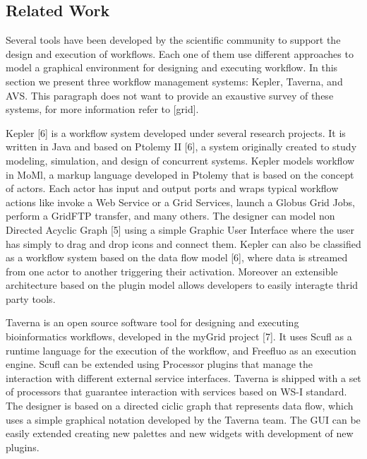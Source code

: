 \documentclass[conference]{IEEEtran}
\begin{document}
\subsection {Related Work}




Several tools have been developed by the scientific community to support
the design and execution of workflows. Each one of them use different
approaches to model a graphical environment for designing and executing
workflow.  In this section we present three workflow management systems:
Kepler, Taverna, and AVS. This paragraph does not want to provide an
exaustive survey of these systems, for more information refer to [grid].

Kepler [6] is a workflow system developed under several research projects.
It is written in Java and based on Ptolemy II [6], a system originally
created to study modeling, simulation, and design of concurrent systems.
Kepler models workflow in MoMl, a markup language developed in Ptolemy that
is based on the concept of actors. Each actor has input and output ports
and wraps typical workflow actions like invoke a Web Service or a Grid
Services, launch a Globus Grid Jobs, perform a GridFTP transfer, and many
others. The designer can model non Directed Acyclic Graph [5] using a
simple Graphic User Interface where the user has simply to drag and drop
icons and connect them.  Kepler can also be classified as a workflow system
based on the data flow model [6], where data is streamed from one actor to
another triggering their activation. Moreover an extensible architecture
based on the plugin model allows developers to easily interagte thrid party
tools.

Taverna is an open source software tool for designing and executing
bioinformatics workflows, developed in the myGrid project [7]. It uses
Scufl as a runtime language for the execution of the workflow, and Freefluo
as an execution engine. Scufl can be extended using Processor plugins that
manage the interaction with different external service interfaces. Taverna
is shipped with a set of processors that guarantee interaction with
services based on WS-I standard. The designer is based on a directed ciclic
graph that represents data flow, which uses a simple graphical notation
developed by the Taverna team. The GUI can be easily extended creating new
palettes and new widgets with development of new plugins.
\end{document}
